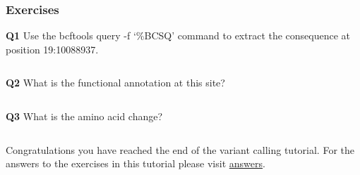 \documentclass[11pt]{article}
\makeatletter
\newcommand{\boxspacing}{\kern\kvtcb@left@rule\kern\kvtcb@boxsep}
\newcommand{\prompt}[4]{

        {\ttfamily\llap{{\color{blue}\LARGE\faKeyboardO\hspace{3pt}#4}}\vspace{-\baselineskip}}
    }
\makeatother
\begin{document}
    \hypertarget{exercises}{%
\subsubsection{Exercises}\label{exercises}}

\textbf{Q1} Use the bcftools query -f `\%BCSQ\n' command to extract the
consequence at position 19:10088937.

    \begin{tcolorbox}[breakable, size=fbox, boxrule=1pt, pad at break*=1mm,colback=cellbackground, colframe=cellborder]
\prompt{In}{incolor}{ }{\boxspacing}
\begin{Verbatim}[commandchars=\\\{\}]

\end{Verbatim}
\end{tcolorbox}

    \textbf{Q2} What is the functional annotation at this site?

    \begin{tcolorbox}[breakable, size=fbox, boxrule=1pt, pad at break*=1mm,colback=cellbackground, colframe=cellborder]
\prompt{In}{incolor}{ }{\boxspacing}
\begin{Verbatim}[commandchars=\\\{\}]

\end{Verbatim}
\end{tcolorbox}

    \textbf{Q3} What is the amino acid change?

    \begin{tcolorbox}[breakable, size=fbox, boxrule=1pt, pad at break*=1mm,colback=cellbackground, colframe=cellborder]
\prompt{In}{incolor}{ }{\boxspacing}
\begin{Verbatim}[commandchars=\\\{\}]

\end{Verbatim}
\end{tcolorbox}

    Congratulations you have reached the end of the variant calling
tutorial. For the answers to the exercises in this tutorial please visit
\href{answers.ipynb}{answers}.


\end{document}

